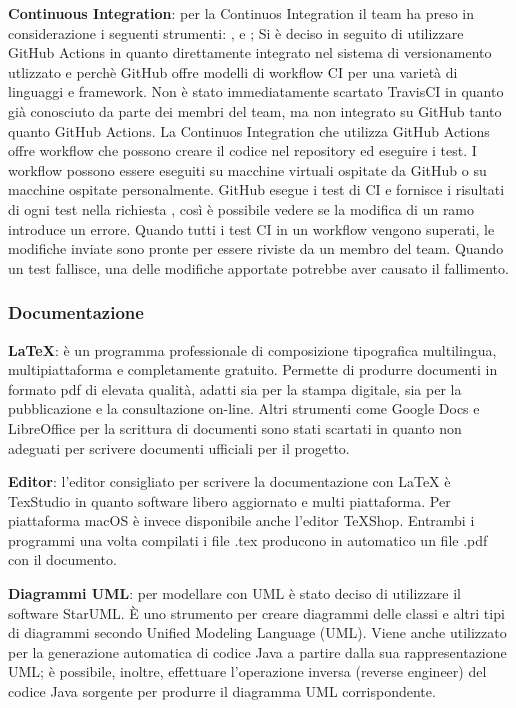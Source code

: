 \begin{description}
\item{\textbf{Continuous Integration}}:  per la Continuos Integration il team ha preso in considerazione i seguenti strumenti: ,  e ;
Si è deciso in seguito di utilizzare GitHub Actions in quanto direttamente integrato nel sistema di versionamento utlizzato e perchè 
GitHub offre modelli di workflow CI per una varietà di linguaggi e framework.
Non è stato immediatamente scartato TravisCI in quanto già conosciuto da parte dei membri del team, ma non integrato su GitHub tanto quanto GitHub Actions.
La Continuos Integration che utilizza GitHub Actions offre workflow che possono creare il codice nel repository ed eseguire i test. 
I workflow possono essere eseguiti su macchine virtuali ospitate da GitHub o su macchine ospitate personalmente.
GitHub esegue i test di CI e fornisce i risultati di ogni test nella richiesta , così è possibile vedere se la modifica di un ramo introduce un errore. 
Quando tutti i test CI in un workflow vengono superati, le modifiche inviate sono pronte per essere riviste da un membro del team. 
Quando un test fallisce, una delle modifiche apportate potrebbe aver causato il fallimento. 

\end{description}

\subsubsection{Documentazione} 
\begin{description}
\item{\textbf{\LaTeX}}: è un programma professionale di composizione tipografica multilingua,
multipiattaforma e completamente gratuito. Permette di produrre documenti in formato pdf di elevata qualità, adatti sia per la stampa digitale, sia
per la pubblicazione e la consultazione on-line. 
Altri strumenti come Google Docs e LibreOffice per la scrittura di documenti sono stati scartati in quanto non adeguati per scrivere documenti ufficiali per il progetto.

\item{\textbf{Editor}}: l’editor  consigliato  per  scrivere  la  documentazione  con  {\LaTeX}  è TexStudio  in  quanto  software  libero  aggiornato  e  multi  piattaforma. Per piattaforma macOS è invece disponibile
anche l'editor TeXShop. Entrambi i programmi una volta compilati i file .tex producono in automatico un file .pdf con il documento.

\item{\textbf{Diagrammi UML}}: per modellare con UML è stato deciso di utilizzare il software StarUML. È uno strumento per creare diagrammi delle classi e altri tipi di diagrammi secondo Unified Modeling Language (UML). 
Viene anche utilizzato per la generazione automatica di codice Java a partire dalla sua rappresentazione UML; è possibile, inoltre, effettuare l’operazione inversa (reverse engineer) del codice Java sorgente per produrre il diagramma UML corrispondente. 
\end{description}

